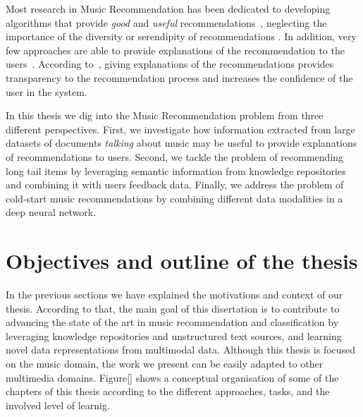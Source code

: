 Most research in Music Recommendation has been dedicated to developing algorithms that provide \textit{good} and \textit{useful} recommendations~\cite{oscarBook}, neglecting the importance of the diversity or serendipity of recommendations \cite{TODO}. In addition, very few approaches are able to provide explanations of the recommendation to the users~\cite{Passant2008, Passant2010}. According to~\cite{celma2008new}, giving explanations of the recommendations provides transparency to the recommendation process and increases the confidence of the user in the system.

In this thesis we dig into the Music Recommendation problem from three different perspectives. First, we investigate how information extracted from large datasets of documents \textit{talking} about music may be useful to provide explanations of recommendations to users. Second, we tackle the problem of recommending long tail items by leveraging semantic information from knowledge repositories and combining it with users feedback data. Finally, we address the problem of cold-start music recommendations by combining different data modalities in a deep neural network.


\section{Objectives and outline of the thesis}
\label{sec:intro:objectives}

In the previous sections we have explained the motivations and context of our thesis. According to that, the main goal of this disertation is to contribute to advancing the state of the art in music recommendation and classification by leveraging knowledge repositories and unstructured text sources, and learning novel data representations from multimodal data. Although this thesis is focused on the music domain, the work we present can be easily adapted to other multimedia domains. Figure\ref{} shows a conceptual organisation of some of the chapters of this thesis according to the different approaches, tasks, and the involved level of learnig.

